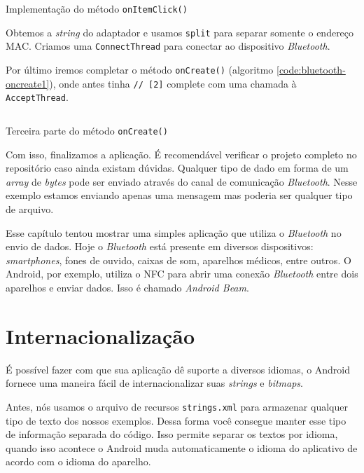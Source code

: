 \documentclass[a4paper,12pt,brazil]{book}
\begin{document}
\begin{singlespace}
	\begin{listing}[H]
	\inputminted[linenos=true,fontsize=\small,frame=lines, framesep=2mm, tabsize=2,numbersep=5pt]{java}{src/api/bluetooth/onitemclick.java}
	\caption{Implementação do método \texttt{onItemClick()}}
	\label{code:bluetooth-onitemclick}
	\end{listing} 	

	Obtemos a \emph{string} do adaptador e usamos \texttt{split} para separar somente o endereço MAC. Criamos uma \texttt{ConnectThread} para conectar ao dispositivo \emph{Bluetooth}.

	Por último iremos completar o método \texttt{onCreate()} (algoritmo \ref{code:bluetooth-oncreate1}), onde antes tinha \texttt{// [2]} complete com uma chamada à \texttt{AcceptThread}. 

	\begin{listing}[H]
	\inputminted[linenos=true,fontsize=\small,frame=lines, framesep=2mm, tabsize=2,numbersep=5pt]{java}{src/api/bluetooth/oncreate3.java}
	\caption{Terceira parte do método \texttt{onCreate()}}
	\label{code:bluetooth-oncreate3}
	\end{listing} 	

	Com isso, finalizamos a aplicação. É recomendável verificar o projeto completo no repositório caso ainda existam dúvidas. Qualquer tipo de dado em forma de um \emph{array} de \emph{bytes} pode ser enviado através do canal de comunicação \emph{Bluetooth}. Nesse exemplo estamos enviando apenas uma mensagem mas poderia ser qualquer tipo de arquivo.

	Esse capítulo tentou mostrar uma simples aplicação que utiliza o \emph{Bluetooth} no envio de dados. Hoje o \emph{Bluetooth} está presente em diversos dispositivos: \emph{smartphones}, fones de ouvido, caixas de som, aparelhos médicos, entre outros. O Android, por exemplo, utiliza o NFC para abrir uma conexão \emph{Bluetooth} entre dois aparelhos e enviar dados. Isso é chamado \emph{Android Beam}. 


\chapter{Internacionalização}

	É possível fazer com que sua aplicação dê suporte a diversos idiomas, o Android fornece uma maneira fácil de internacionalizar suas \emph{strings} e \emph{bitmaps}. 

	Antes, nós usamos o arquivo de recursos \texttt{strings.xml} para armazenar qualquer tipo de texto dos nossos exemplos. Dessa forma você consegue manter esse tipo de informação separada do código. Isso permite separar os textos por idioma, quando isso acontece o Android muda automaticamente o idioma do aplicativo de acordo com o idioma do aparelho.
	

\end{singlespace}
\end{document}
